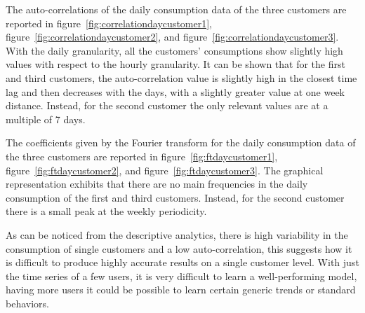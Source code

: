 The auto-correlations of the daily consumption data of the three customers are reported in figure~\ref{fig:correlationdaycustomer1},  figure~\ref{fig:correlationdaycustomer2}, and  figure~\ref{fig:correlationdaycustomer3}.
With the daily granularity, all the customers' consumptions show slightly high values with respect to the hourly granularity.
It can be shown that for the first and third customers, the auto-correlation value is slightly high in the closest time lag and then decreases with the days, with a slightly greater value at one week distance.
Instead, for the second customer the only relevant values are at a multiple of 7 days.

The coefficients given by the Fourier transform for the daily consumption data of the three customers are reported in figure~\ref{fig:ftdaycustomer1}, figure~\ref{fig:ftdaycustomer2}, and figure~\ref{fig:ftdaycustomer3}.
The graphical representation exhibits that there are no main frequencies in the daily consumption of the first and third customers.
Instead, for the second customer there is a small peak at the weekly periodicity.

As can be noticed from the descriptive analytics, there is high variability in the consumption of single customers and a low auto-correlation, this suggests how it is difficult to produce highly accurate results on a single customer level.
With just the time series of a few users, it is very difficult to learn a well-performing model, having more users it could be possible to learn certain generic trends or standard behaviors.

